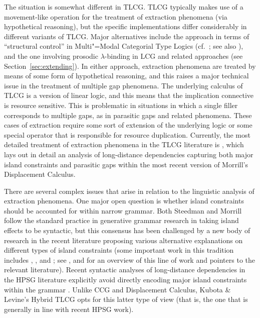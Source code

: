 \documentclass[output=paper
                ,modfonts
                ,nonflat
	        ,collection
	        ,collectionchapter
	        ,collectiontoclongg
 	        ,biblatex
                ,babelshorthands
                ,newtxmath
                ,draftmode
                ,colorlinks, citecolor=brown
]{./langsci/langscibook}
\begin{document}
The situation is somewhat different in TLCG. TLCG typically makes use
of a movement-like operation for the treatment of extraction
phenomena (via hypothetical reasoning), but the specific implementations differ considerably in
different variants of TLCG. Major alternatives include the approach in
terms of   ``structural control'' in Multi"=Modal Categorial Type
Logics (cf.~\citealt{BernardiPhD,Moortgat2011a-u};
see also \citealt{Morrill94a-u}), and the one involving prosodic
$\lambda$-binding in LCG and related approaches (see
Section~\ref{sec:extending}). In either approach, extraction phenomena
are treated by means of some form of hypothetical reasoning, and this
raises a major technical issue in the treatment of multiple gap
phenomena. The underlying calculus of TLCG is a version of linear
logic, and this means that the implication connective is resource
sensitive. This is problematic in situations in which a single filler
corresponds to multiple gaps, as in parasitic gaps and related
phenomena. These cases of extraction require some sort of extension of
the underlying logic or some special operator that is responsible for
resource duplication. Currently, the most detailed treatment of
extraction phenomena in the TLCG literature is \citet{morrilllp},
which lays out in detail an analysis of long-distance dependencies
capturing both major island constraints and parasitic gaps within the
most recent version of Morrill's Displacement Calculus.

There are several complex issues that arise in relation to the
linguistic analysis of extraction phenomena. One major open question
is whether island constraints should be accounted for within narrow
grammar. Both Steedman and Morrill follow the standard practice in
generative grammar research in taking island effects to be syntactic,
but this consensus has been challenged by a new body of research in
the recent literature proposing various alternative explanations on
different types of island constraints (some important work in this
tradition includes \citealt{deaneBook}, \citealt{kluender98},
\citealt{HS2010a-u} and \citealt{CP2020a-u}; see
, \citealt{levine2017} and
\citealt{newmeyer2016} for an overview of this line of work and pointers
to the relevant literature). Recent syntactic analyses of
long-distance dependencies in the HPSG literature explicitly avoid
directly encoding major island constraints within the grammar
\citep{Sag2010b,chaves12b}. Unlike CCG and Displacement Calculus,
Kubota \& Levine's Hybrid TLCG opts for this latter type of view (that
is, the one that is generally in line with recent HPSG work).
\end{document}
